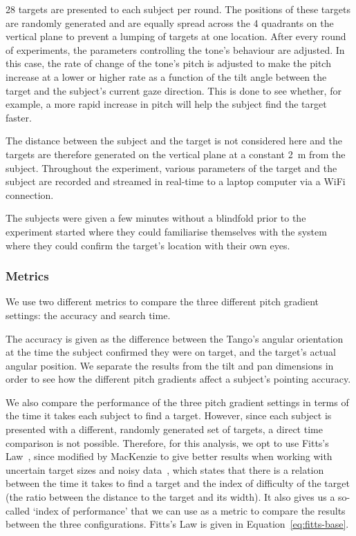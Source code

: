 \documentclass[format=sigconf, review=true, screen=true, anonymous=true]{acmart}
\begin{document}
28 targets are presented to each subject per round. The positions of these targets are randomly generated and are equally spread across the 4 quadrants on the vertical plane to prevent a lumping of targets at one location. After every round of experiments, the parameters controlling the tone's behaviour are adjusted. In this case, the rate of change of the tone's pitch is adjusted to make the pitch increase at a lower or higher rate as a function of the tilt angle between the target and the subject's current gaze direction. This is done to see whether, for example, a more rapid increase in pitch will help the subject find the target faster. 

The distance between the subject and the target is not considered here and the targets are therefore generated on the vertical plane at a constant \SI{2}{\meter} from the subject. Throughout the experiment, various parameters of the target and the subject are recorded and streamed in real-time to a laptop computer via a WiFi connection.

The subjects were given a few minutes without a blindfold prior to the experiment started where they could familiarise themselves with the system where they could confirm the target's location with their own eyes.

\subsubsection{Metrics}

We use two different metrics to compare the three different pitch gradient settings: the accuracy and search time. 

The accuracy is given as the difference between the Tango's angular orientation at the time the subject confirmed they were on target, and the target's actual angular position. We separate the results from the tilt and pan dimensions in order to see how the different pitch gradients affect a subject's pointing accuracy. 


We also compare the performance of the three pitch gradient settings in terms of the time it takes each subject to find a target. However, since each subject is presented with a different, randomly generated set of targets, a direct time comparison is not possible. Therefore, for this analysis, we opt to use Fitts's Law~\cite{fitts1954information}, since modified by MacKenzie to give better results when working with uncertain target sizes and noisy data~\cite{mackenzie1992fitts}, which states that there is a relation between the time it takes to find a target and the index of difficulty of the target (the ratio between the distance to the target and its width). It also gives us a so-called `index of performance' that we can use as a metric to compare the results between the three configurations. Fitts's Law is given in Equation~\ref{eq:fitts-base}. 
\end{document}
